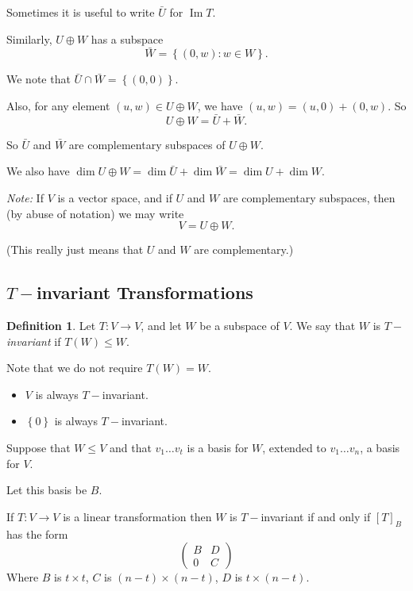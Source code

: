 \documentclass{article}
\theoremstyle{definition} \newtheorem*{definition}{Definition}
\DeclareMathOperator{\Ima}{Im} \DeclareMathOperator{\Sym}{Sym}
\begin{document}
Sometimes it is useful to write $\bar{U}$ for $\Ima T$.

Similarly, $U \oplus W$ has a subspace 
\[
  \bar{W} = \left\{ (0, w) : w \in W \right\}.
  \]

  We note that $\bar{U} \cap \bar{W} = \left\{ (0,0) \right\}$.

  Also, for any element $(u,w) \in U \oplus W$, we have 
  $(u,w) = (u,0) + (0,w)$. So 
  \[
    U \oplus W = \bar{U} + \bar{W}.
  \]

  So $\bar{U}$ and $\bar{W}$ are complementary subspaces of $U \oplus W$.

  We also have $\dim U \oplus W = \dim \bar{U} + \dim \bar{W} = 
  \dim U + \dim W$.

  \emph{Note:} If $V$ is a vector space, and if $U$ and $W$ are 
  complementary subspaces, then (by abuse of notation) we may write
  \[
    V = U \oplus W.
  \]

  (This really just means that $U$ and $W$ are complementary.)\\

  \subsection{$T-$invariant Transformations}
  \begin{definition}
    Let $T:V \rightarrow V$, and let $W$ be a subspace of $V$. We say 
    that $W$ is $T-$\emph{invariant} if $T(W) \leq W$. 

    Note that we do not require $T(W) = W$.\\
  \end{definition}

  \begin{exmps}\hfill
    \begin{itemize}
      \item 
        $V$ is always $T-$invariant.
      \item $\left\{ 0 \right\}$ is always $T-$invariant.
    \end{itemize}
  \end{exmps}

  Suppose that $W \leq V$ and that $v_1 \dots v_t$ is a basis for $W$,
  extended to $v_1 \dots v_n$, a basis for $V$.

  Let this basis be $B$.

  If $T : V \rightarrow V$ is a linear transformation then $W$ is
  $T-$invariant if and only if $[T]_B$ has the form
  \[
    \left( 
      \begin{matrix}
        B & D \\
        0 & C
      \end{matrix}
    \right)
  \]
 Where $B$ is $t \times t$, $C$ is $(n-t)\times (n-t)$, $D$ is $t \times
 (n-t)$.
\end{document}
